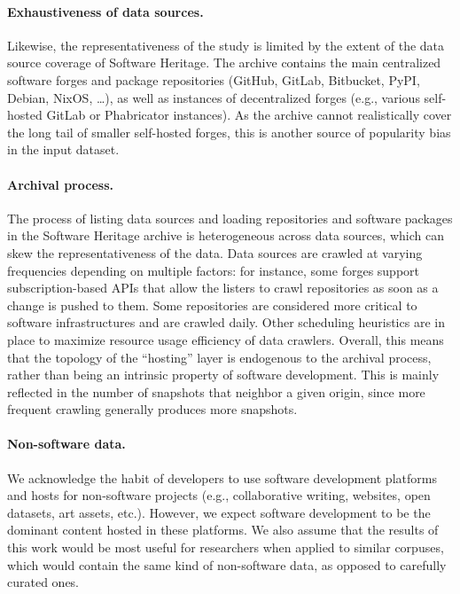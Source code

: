 \paragraph{Exhaustiveness of data sources.}
Likewise, the representativeness of the study is limited by the extent of the
data source coverage of Software Heritage. The archive contains the main
centralized software forges and package repositories (GitHub, GitLab,
Bitbucket, PyPI, Debian, NixOS, …), as well as instances of decentralized
forges (e.g., various self-hosted GitLab or Phabricator instances). As the
archive cannot realistically cover the long tail of smaller self-hosted forges,
this is another source of popularity bias in the input dataset.

\paragraph{Archival process.}
The process of listing data sources and loading repositories and software
packages in the Software Heritage archive is heterogeneous across data sources,
which can skew the representativeness of the data. Data sources are crawled
at varying frequencies depending on multiple factors: for instance, some forges
support subscription-based APIs that allow the listers to crawl repositories as
soon as a change is pushed to them. Some repositories are considered more
critical to software infrastructures and are crawled daily. Other scheduling
heuristics are in place to maximize resource usage efficiency of data crawlers.
Overall, this means that the topology of the ``hosting'' layer is endogenous to
the archival process, rather than being an intrinsic property of software
development. This is mainly reflected in the number of snapshots that neighbor
a given origin, since more frequent crawling generally produces more snapshots.

\paragraph{Non-software data.}
We acknowledge the habit of developers to use software development platforms
and hosts for non-software projects (e.g., collaborative writing, websites,
open datasets, art assets, etc.). However, we expect software development to be
the dominant content hosted in these platforms. We also assume that the results
of this work would be most useful for researchers when applied to similar
corpuses, which would contain the same kind of non-software data, as opposed to
carefully curated ones.
